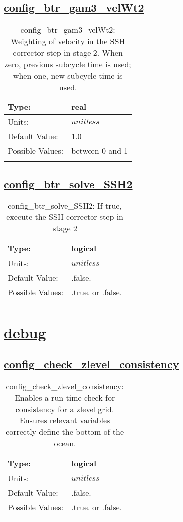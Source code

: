 \subsection[config\_btr\_gam3\_velWt2]{\hyperref[sec:nm_tab_split_explicit_ts]{config\_btr\_gam3\_velWt2}}
\label{subsec:nm_sec_config_btr_gam3_velWt2}
\begin{center}
\begin{longtable}{| p{2.0in} | p{4.0in} |}
    \hline
    Type: & real \\
    \hline
    Units: & $unitless$ \\
    \hline
    Default Value: & 1.0 \\
    \hline
    Possible Values: & between 0 and 1 \\
    \hline
    \caption{config\_btr\_gam3\_velWt2: Weighting of velocity in the SSH corrector step in stage 2.  When zero, previous subcycle time is used; when one, new subcycle time is used.}
\end{longtable}
\end{center}
\subsection[config\_btr\_solve\_SSH2]{\hyperref[sec:nm_tab_split_explicit_ts]{config\_btr\_solve\_SSH2}}
\label{subsec:nm_sec_config_btr_solve_SSH2}
\begin{center}
\begin{longtable}{| p{2.0in} | p{4.0in} |}
    \hline
    Type: & logical \\
    \hline
    Units: & $unitless$ \\
    \hline
    Default Value: & .false. \\
    \hline
    Possible Values: & .true. or .false. \\
    \hline
    \caption{config\_btr\_solve\_SSH2: If true, execute the SSH corrector step in stage 2}
\end{longtable}
\end{center}
\section[debug]{\hyperref[sec:nm_tab_debug]{debug}}
\label{sec:nm_sec_debug}
\subsection[config\_check\_zlevel\_consistency]{\hyperref[sec:nm_tab_debug]{config\_check\_zlevel\_consistency}}
\label{subsec:nm_sec_config_check_zlevel_consistency}
\begin{center}
\begin{longtable}{| p{2.0in} | p{4.0in} |}
    \hline
    Type: & logical \\
    \hline
    Units: & $unitless$ \\
    \hline
    Default Value: & .false. \\
    \hline
    Possible Values: & .true. or .false. \\
    \hline
    \caption{config\_check\_zlevel\_consistency: Enables a run-time check for consistency for a zlevel grid. Ensures relevant variables correctly define the bottom of the ocean.}
\end{longtable}
\end{center}
